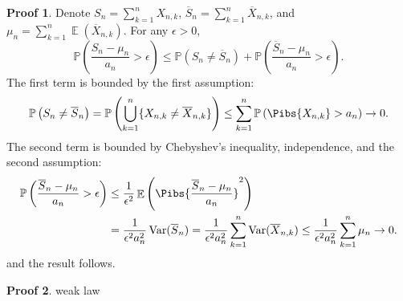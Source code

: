 \documentclass[hidelinks,11pt]{article}
\theoremstyle{definition}
\theoremstyle{dotless}
\newtheorem{prop}{Proof}[section]
\theoremstyle{remark}
\DeclareMathOperator{\Var}{Var}
\DeclareMathOperator{\E}{\mathbb{E}}
\DeclareMathOperator{\1}{\mathbf{1}}
\begin{document}
\begin{prop}
Denote $S_n=\sum_{k=1}^nX_{n,k}$, $\overline{S}_n=\sum_{k=1}^n\overline{X}_{n,k}$, and $\mu_n=\sum_{k=1}^n\E(\overline{X}_{n,k})$. For any $\epsilon>0$,
\[\mathbb{P}\left({\frac{S_n-\mu_n}{a_n}}>\epsilon\right)\leq\mathbb{P}(S_n\neq\overline{S}_n)+\mathbb{P}\left({\frac{\overline{S}_n-\mu_n}{a_n}}>\epsilon\right).\]
The first term is bounded by the first assumption:
\[\mathbb{P}\left(S_n\neq\overline{S}_n\right)=\mathbb{P}\left(\bigcup_{k=1}^n\{X_{n,k}\neq\overline{X}_{n,k}\}\right)\leq\sum_{k=1}^n\mathbb{P}\left(\Pibs{X_{n,k}}>a_n\right)\to0.\]
The second term is bounded by Chebyshev's inequality, independence, and the second assumption:
\begin{align*}
\mathbb{P}\left({\frac{\overline{S}_n-\mu_n}{a_n}}>\epsilon\right)&\leq\frac{1}{\epsilon^2}\E\left(\Pibs{\frac{\overline{S}_n-\mu_n}{a_n}}^2\right)\\
&=\frac{1}{\epsilon^2a_n^2}\Var(\overline{S}_n)=\frac{1}{\epsilon^2a_n^2}\sum_{k=1}^n\Var(\overline{X}_{n,k})\leq\frac{1}{\epsilon^2a_n^2}\sum_{k=1}^n\mu_n\to0.
\end{align*}
and the result follows.
\end{prop}

\begin{prop}
weak law
\end{prop}
\end{document}
